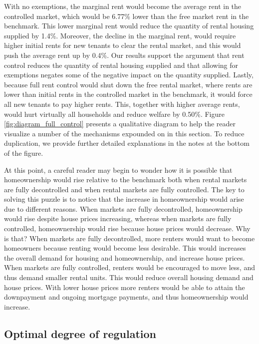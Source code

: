 \documentclass[parskip=full]{article}
\begin{document}
With no exemptions, the marginal rent would become the average rent in the controlled market, which would be 6.77\% lower than the free market rent in the benchmark. This lower marginal rent would reduce the quantity of rental housing supplied by 1.4\%. Moreover, the decline in the marginal rent, would require higher initial rents for new tenants to clear the rental market, and this would push the average rent up by 0.4\%. Our results support the argument that rent control reduces the quantity of rental housing supplied and that allowing for exemptions negates some of the negative impact on the quantity supplied. Lastly, because full rent control would shut down the free rental market, where rents are lower than initial rents in the controlled market in the benchmark, it would force all new tenants to pay higher rents. This, together with higher average rents, would hurt virtually all households and reduce welfare by 0.50\%. Figure \ref{fig:diagram_full_control} presents a qualitative diagram to help the reader visualize a number of the mechanisms expounded on in this section. To reduce duplication, we provide further detailed explanations in the notes at the bottom of the figure.

At this point, a careful reader may begin to wonder how it is possible that homeownership would rise relative to the benchmark both when rental markets are fully decontrolled and when rental markets are fully controlled. The key to solving this puzzle is to notice that the increase in homeownership would arise due to different reasons. When markets are fully decontrolled, homeownership would rise despite house prices increasing, whereas when markets are fully controlled, homeownership would rise because house prices would decrease. Why is that? When markets are fully decontrolled, more renters would want to become homeowners because renting would become less desirable. This would increases the overall demand for housing and homeownership, and increase house prices. When markets are fully controlled, renters would be encouraged to move less, and thus demand smaller rental units. This would reduce overall housing demand and house prices. With lower house prices more renters would be able to attain the downpayment and ongoing mortgage payments, and thus homeownership would increase.

\subsection{Optimal degree of regulation}
\end{document}
